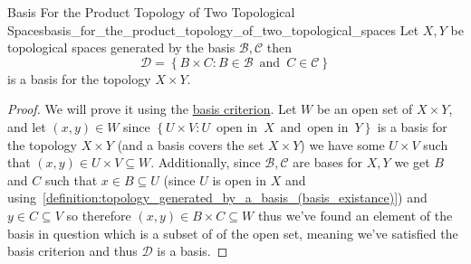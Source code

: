 \begin{proposition}
{Basis For the Product Topology of Two Topological
Spaces}{basis_for_the_product_topology_of_two_topological_spaces}
Let \(X, Y \) be topological spaces generated by the basis \(\mathcal{B},
\mathcal{C} \) then
\[
\mathcal{D} = \left\{B \times C: B \in \mathcal{B} \enspace \text{and}
\enspace C \in \mathcal{C} \right\}
\]
is a basis for the topology \(X \times Y \).
\end{proposition}
\begin{proof}
   We will prove it using the \hyperref[lemma:basis_criterion]{basis
   criterion}. Let \(W \) be an open set of \(X \times Y \), and let \(
   \left(x, y\right) \in W \) since \(\left\{U \times V: U \enspace
   \text{open in} \enspace X \enspace \text{and} \enspace \text{open
   in} \enspace Y \right\} \) is a basis for the topology \(X \times Y \)
   (and a basis covers the set \(X \times Y \)) we have some \(U \times V \)
   such that \(\left(x, y\right) \in U \times V \subseteq W \).
   Additionally, since \(\mathcal{B}, \mathcal{C} \) are bases for \(X, Y \) we
   get \(B \) and \(C \) such that \(x \in B \subseteq U \) (since \(U \) is
   open in \(X \) and
   using~\ref{definition:topology_generated_by_a_basis_(basis_existance)}) and
   \(y \in C \subseteq V \) so therefore \(\left(x, y\right) \in B \times C
   \subseteq W \) thus we've found an element of the basis in question which is
   a subset of of the open set, meaning we've satisfied the basis criterion and
   thus \(\mathcal{D} \) is a basis.
\end{proof}
